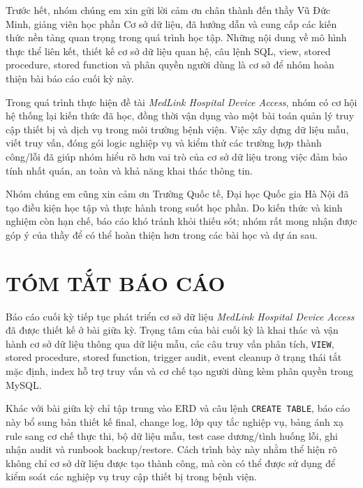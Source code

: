 \documentclass[12pt, a4paper, oneside, openany]{report}
\begin{document}
Trước hết, nhóm chúng em xin gửi lời cảm ơn chân thành đến thầy Vũ Đức Minh, giảng viên học phần Cơ sở dữ liệu, đã hướng dẫn và cung cấp các kiến thức nền tảng quan trọng trong quá trình học tập. Những nội dung về mô hình thực thể liên kết, thiết kế cơ sở dữ liệu quan hệ, câu lệnh SQL, view, stored procedure, stored function và phân quyền người dùng là cơ sở để nhóm hoàn thiện bài báo cáo cuối kỳ này.

Trong quá trình thực hiện đề tài \textit{MedLink Hospital Device Access}, nhóm có cơ hội hệ thống lại kiến thức đã học, đồng thời vận dụng vào một bài toán quản lý truy cập thiết bị và dịch vụ trong môi trường bệnh viện. Việc xây dựng dữ liệu mẫu, viết truy vấn, đóng gói logic nghiệp vụ và kiểm thử các trường hợp thành công/lỗi đã giúp nhóm hiểu rõ hơn vai trò của cơ sở dữ liệu trong việc đảm bảo tính nhất quán, an toàn và khả năng khai thác thông tin.

Nhóm chúng em cũng xin cảm ơn Trường Quốc tế, Đại học Quốc gia Hà Nội đã tạo điều kiện học tập và thực hành trong suốt học phần. Do kiến thức và kinh nghiệm còn hạn chế, báo cáo khó tránh khỏi thiếu sót; nhóm rất mong nhận được góp ý của thầy để có thể hoàn thiện hơn trong các bài học và dự án sau.

\clearpage

\chapter*{TÓM TẮT BÁO CÁO}

Báo cáo cuối kỳ tiếp tục phát triển cơ sở dữ liệu \textit{MedLink Hospital Device Access} đã được thiết kế ở bài giữa kỳ. Trọng tâm của bài cuối kỳ là khai thác và vận hành cơ sở dữ liệu thông qua dữ liệu mẫu, các câu truy vấn phân tích, \texttt{VIEW}, stored procedure, stored function, trigger audit, event cleanup ở trạng thái tắt mặc định, index hỗ trợ truy vấn và cơ chế tạo người dùng kèm phân quyền trong MySQL.

Khác với bài giữa kỳ chỉ tập trung vào ERD và câu lệnh \texttt{CREATE TABLE}, báo cáo này bổ sung bản thiết kế final, change log, lớp quy tắc nghiệp vụ, bảng ánh xạ rule sang cơ chế thực thi, bộ dữ liệu mẫu, test case dương/tình huống lỗi, ghi nhận audit và runbook backup/restore. Cách trình bày này nhằm thể hiện rõ không chỉ cơ sở dữ liệu được tạo thành công, mà còn có thể được sử dụng để kiểm soát các nghiệp vụ truy cập thiết bị trong bệnh viện.

\clearpage
\tableofcontents
\clearpage
\listoffigures
\clearpage
\listoftables
\clearpage
{}
\end{document}
